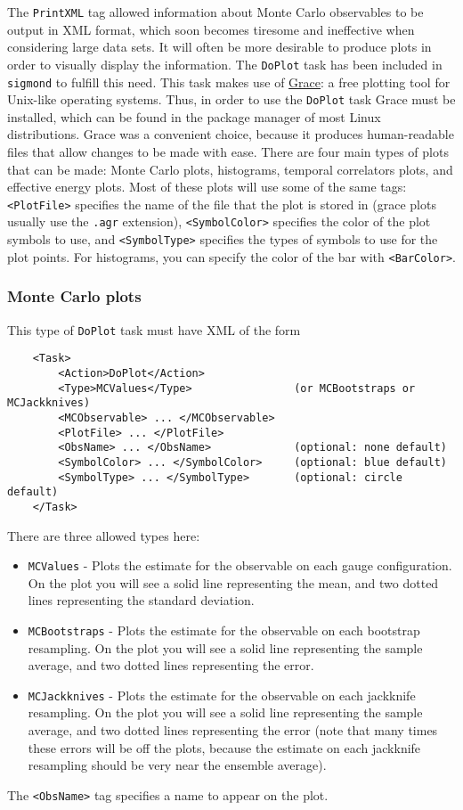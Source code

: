 \documentclass[12pt,notitlepage,letterpaper]{article}
\newcommand{\vb}{\texttt}
\begin{document}
The \vb{PrintXML} tag allowed information about Monte Carlo observables to be output
in XML format, which soon becomes tiresome and ineffective when considering large data sets.
It will often be more desirable to produce plots in order to visually display the information.
The \vb{DoPlot} task has been included in \vb{sigmond} to fulfill this need. This task makes
use of \href{http://plasma-gate.weizmann.ac.il/Grace/}{Grace}: a free plotting tool
for Unix-like operating systems. Thus, in order to use the \vb{DoPlot} task Grace must
be installed, which can be found in the package manager of most Linux distributions.
Grace was a convenient choice, because it produces human-readable files that allow
changes to be made with ease. 
There are four main types of plots that can be made: Monte Carlo plots,
histograms, temporal correlators plots, and effective energy plots.
Most of these plots will use some of the same tags: \vb{<PlotFile>}
specifies the name of the file that the plot is stored in (grace plots
usually use the \vb{.agr} extension), \vb{<SymbolColor>}
specifies the color of the plot symbols to use, and \vb{<SymbolType>}
specifies the types of symbols to use for the plot points.
For histograms, you can specify the color of the bar
with \vb{<BarColor>}.

\subsubsection{Monte Carlo plots}
This type of \vb{DoPlot} task must have XML of the form
\begin{verbatim}
    <Task>
        <Action>DoPlot</Action>
        <Type>MCValues</Type>                (or MCBootstraps or MCJackknives)
        <MCObservable> ... </MCObservable>
        <PlotFile> ... </PlotFile>
        <ObsName> ... </ObsName>             (optional: none default)
        <SymbolColor> ... </SymbolColor>     (optional: blue default)
        <SymbolType> ... </SymbolType>       (optional: circle default)
    </Task>
\end{verbatim}
There are three allowed types here:
\begin{itemize}
\item \vb{MCValues} - Plots the estimate for the observable on each gauge configuration. On the
plot you will see a solid line representing the mean, and two dotted lines representing the
standard deviation.
\item \vb{MCBootstraps} - Plots the estimate for the observable on each bootstrap resampling. On the
plot you will see a solid line representing the sample average, and two dotted lines representing the
error.
\item \vb{MCJackknives} - Plots the estimate for the observable on each jackknife resampling. On the
plot you will see a solid line representing the sample average, and two dotted lines representing the
error (note that many times these errors will be off the plots, because the estimate on each
jackknife resampling should be very near the ensemble average).
\end{itemize}
The \vb{<ObsName>} tag specifies a name to appear on the plot.
\end{document}
